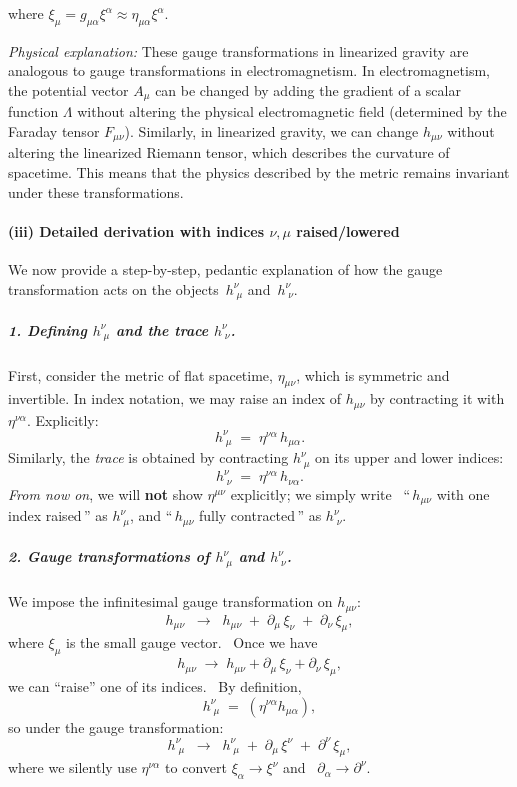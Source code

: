 \documentclass{article}
\begin{document}
where $\xi_{\mu} = g_{\mu \alpha} \xi^{\alpha} \approx \eta_{\mu \alpha} \xi^{\alpha}$.

\textit{Physical explanation:} These gauge transformations in linearized gravity are analogous to gauge transformations in electromagnetism. In electromagnetism, the potential vector $A_{\mu}$ can be changed by adding the gradient of a scalar function $\Lambda$ without altering the physical electromagnetic field (determined by the Faraday tensor $F_{\mu\nu}$). Similarly, in linearized gravity, we can change $h_{\mu\nu}$ without altering the linearized Riemann tensor, which describes the curvature of spacetime. This means that the physics described by the metric remains invariant under these transformations.

\paragraph{(iii) Detailed derivation with indices \boldmath\(\nu,\mu\) raised/lowered}

We now provide a step-by-step, pedantic explanation of how the gauge transformation acts on the objects
\(\,h^\nu_{\;\mu}\) and \(\,h^\nu_{\;\nu}\).

\medskip

\noindent
\subparagraph{1. Defining \boldmath\(h^\nu_{\;\mu}\) and the trace \boldmath\(h^\nu_{\;\nu}\).}
First, consider the metric of flat spacetime, \(\eta_{\mu\nu}\), which is symmetric and invertible. In index notation, we may raise an index of \(h_{\mu\nu}\) by contracting it with \(\eta^{\nu\alpha}\). Explicitly:
\[
h^\nu_{\;\mu}
  \;=\; 
\eta^{\nu\alpha}\,h_{\mu\alpha}.
\]
Similarly, the \emph{trace} is obtained by contracting \(h^\nu_{\;\mu}\) on its upper and lower indices:
\[
h^\nu_{\;\nu}
  \;=\;
\eta^{\nu\alpha}\,h_{\nu\alpha}.
\]
\emph{From now on}, we will \textbf{not} show \(\eta^{\mu\nu}\) explicitly; we simply write 
“\(\,h_{\mu\nu}\) with one index raised\,” as \(h^\nu_{\;\mu}\), and
“\(\,h_{\mu\nu}\) fully contracted\,” as \(h^\nu_{\;\nu}\).

\medskip

\noindent
\subparagraph{2. Gauge transformations of \boldmath\(h^\nu_{\;\mu}\) and \boldmath\(h^\nu_{\;\nu}\).}
We impose the infinitesimal gauge transformation on \(h_{\mu\nu}\):
\[
h_{\mu\nu}
  \;\;\longrightarrow\;\;
h_{\mu\nu}
  \;+\;
\partial_\mu \,\xi_\nu
  \;+\;
\partial_\nu \,\xi_\mu,
\]
where \(\xi_\mu\) is the small gauge vector.  Once we have 
\[
h_{\mu\nu} \;\to\; h_{\mu\nu} + \partial_\mu\,\xi_\nu + \partial_\nu\,\xi_\mu,
\]
we can “raise” one of its indices.  By definition,
\[
h^\nu_{\;\mu}
  \;=\;
(\eta^{\nu\alpha} h_{\mu\alpha}),
\]
so under the gauge transformation:
\[
h^\nu_{\;\mu}
  \;\;\longrightarrow\;\;
h^\nu_{\;\mu}
  \;+\;
\partial_\mu \,\xi^\nu
  \;+\;
\partial^\nu \,\xi_\mu,
\]
where we silently use \(\eta^{\nu\alpha}\) to convert \(\xi_\alpha \to \xi^\nu\) and 
\(\partial_\alpha \to \partial^\nu\).  
\end{document}
